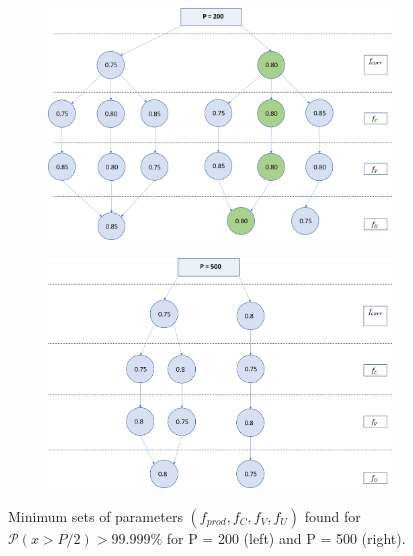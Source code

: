   
 \begin{figure}[H]
 \centering
    \begin{subfigure}[b]{0.45\textwidth}
        \includegraphics[width=\textwidth]{Figures/tree_P_200}
    \end{subfigure}
    \begin{subfigure}[b]{0.47\textwidth}
        \includegraphics[width=\textwidth]{Figures/tree_P_500}
    \end{subfigure}    
    \caption{Minimum sets of parameters $(f_{prod}, f_C, f_V, f_U)$ found for $\mathcal{P}(x>P/2) > 99.999\%$ for P = 200 (left) and P = 500 (right).}
    \label{fig:tree}
\end{figure}


